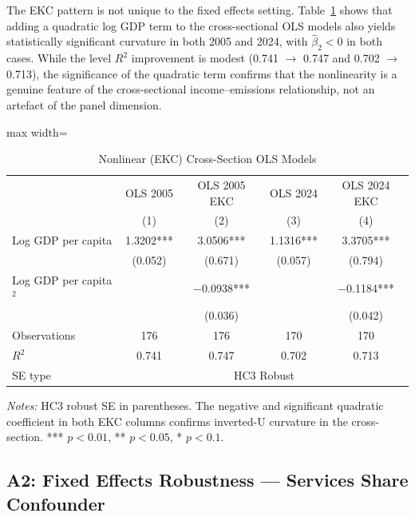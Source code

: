 \documentclass[12pt, a4paper]{article}
\begin{document}
The EKC pattern is not unique to the fixed effects setting. Table~\ref{tab:ekc_ols} shows that adding a quadratic log GDP term to the cross-sectional OLS models also yields statistically significant curvature in both 2005 and 2024, with $\hat{\beta}_2 < 0$ in both cases. While the level $R^2$ improvement is modest (0.741 $\to$ 0.747 and 0.702 $\to$ 0.713), the significance of the quadratic term confirms that the nonlinearity is a genuine feature of the cross-sectional income--emissions relationship, not an artefact of the panel dimension.

\begin{table}[H]
\centering
\caption{Nonlinear (EKC) Cross-Section OLS Models}
\label{tab:ekc_ols}
\begin{adjustbox}{max width=\textwidth}
\begin{threeparttable}
\small
\setlength{\tabcolsep}{6pt}
\begin{tabular}{lcccc}
\toprule
 & OLS 2005 & OLS 2005 EKC & OLS 2024 & OLS 2024 EKC \\
 & (1) & (2) & (3) & (4) \\
\midrule
Log GDP per capita
    & 1.3202*** & 3.0506***    & 1.1316*** & 3.3705*** \\
    & (0.052)   & (0.671)      & (0.057)   & (0.794)   \\[4pt]
Log GDP per capita$^2$
    &           & $-$0.0938*** &           & $-$0.1184*** \\
    &           & (0.036)      &           & (0.042)   \\
\midrule
Observations & 176   & 176   & 170   & 170   \\
$R^2$        & 0.741 & 0.747 & 0.702 & 0.713 \\
SE type      & \multicolumn{4}{c}{HC3 Robust} \\
\bottomrule
\end{tabular}
\begin{tablenotes}
\small
\item \textit{Notes:} HC3 robust SE in parentheses. The negative and significant quadratic coefficient in both EKC columns confirms inverted-U curvature in the cross-section. *** $p<0.01$, ** $p<0.05$, * $p<0.1$.
\end{tablenotes}
\end{threeparttable}
\end{adjustbox}
\end{table}

\subsection*{A2: Fixed Effects Robustness --- Services Share Confounder}
\end{document}
